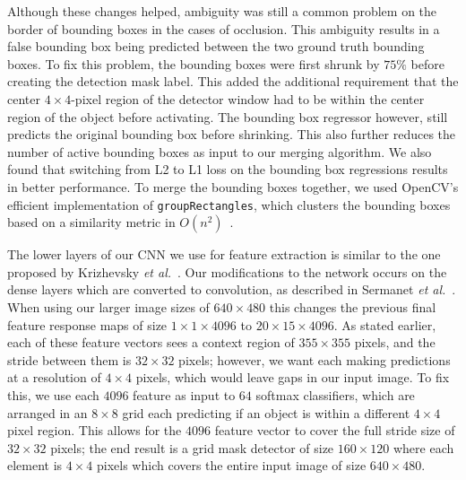 \documentclass[journal]{IEEEtran}
\begin{document}
Although these changes helped, ambiguity was still a common problem on the border of bounding boxes in the cases of occlusion. This ambiguity results in a false bounding box being predicted between the two ground truth bounding boxes. To fix this problem, the bounding boxes were first shrunk by $75\%$ before creating the detection mask label. This added the additional requirement that the center $4 \times 4$-pixel region of the detector window had to be within the center region of the object before activating. The bounding box regressor however, still predicts the original bounding box before shrinking. This also further reduces the number of active bounding boxes as input to our merging algorithm. We also found that switching from L2 to L1 loss on the bounding box regressions results in better performance. To merge the bounding boxes together, we used OpenCV's efficient implementation of \texttt{groupRectangles}, which clusters the bounding boxes based on a similarity metric in $O(n^2)$~\cite{opencv}.

The lower layers of our CNN we use for feature extraction is similar to the one proposed by Krizhevsky \textit{et al.}~\cite{krizhevsky-2012}. Our modifications to the network occurs on the dense layers which are converted to convolution, as described in Sermanet \textit{et al.}~\cite{sermanet-2013}. When using our larger image sizes of $640 \times 480$ this changes the previous final feature response maps of size $1\times 1\times 4096$ to $20 \times 15 \times 4096$. As stated earlier, each of these feature vectors sees a context region of $355 \times 355$ pixels, and the stride between them is $32 \times 32$ pixels; however, we want each making predictions at a resolution of $4 \times 4$ pixels, which would leave gaps in our input image. To fix this, we use each $4096$ feature as input to $64$ softmax classifiers, which are arranged in an $8 \times 8$ grid each predicting if an object is within a different $4 \times 4$ pixel region. This allows for the $4096$ feature vector to cover the full stride size of $32 \times 32$ pixels; the end result is a grid mask detector of size $160 \times 120$ where each element is $4 \times 4$ pixels which covers the entire input image of size $640 \times 480$.
\end{document}
